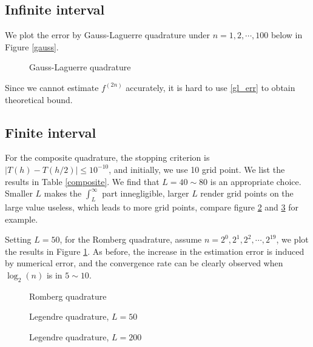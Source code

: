 \documentclass[conference,onecolumn,12pt]{IEEEtran}
\theoremstyle{definition}
\begin{document}
\subsection{Infinite interval}
We plot the error by Gauss-Laguerre quadrature under $n=1,2,\cdots,100$ below in Figure \ref{gauss}. \\
\begin{figure}[!htbp]
    \centering
    \resizebox{0.45\textwidth}{!}{
             \label{gauss}
    }
    \caption{Gauss-Laguerre quadrature}

\end{figure}

Since we cannot estimate $f^{(2n)}$ accurately, it is hard to use \ref{gl_err} to obtain theoretical bound.

\subsection{Finite interval}

For the composite quadrature, the stopping criterion is $|T(h)-T(h/2)|\leq 10^{-10}$, and initially, we use 10 grid point. We list the results in Table \ref{composite}. We find that $L=40\sim 80$ is an appropriate choice. Smaller $L$ makes the $\int_L^\infty$ part innegligible, larger $L$ render grid points on the large value useless, which leads to more grid points, compare figure \ref{legendre} and \ref{legendre2} for example.

Setting $L=50$, for the Romberg quadrature, assume $n = 2^0,2^1,2^2,\cdots,2^{19}$, we plot the results in Figure \ref{romberg}. As before, the increase in the estimation error is induced by numerical error, and the convergence rate can be clearly observed when $\log_2(n)$ is in $5\sim 10$.

\begin{figure}[!htbp]
    \centering
    \resizebox{0.45\textwidth}{!}{
             
    }
    \caption{Romberg quadrature}
    \label{romberg}
\end{figure}

\begin{figure}[!htbp]
    \centering
    \resizebox{0.45\textwidth}{!}{
             
    }
    \caption{Legendre quadrature, $L=50$}
    \label{legendre}
\end{figure}

\begin{figure}[!htbp]
    \centering
    \resizebox{0.45\textwidth}{!}{
            
    }
    \caption{Legendre quadrature, $L=200$}
    \label{legendre2}
\end{figure}
\end{document}
